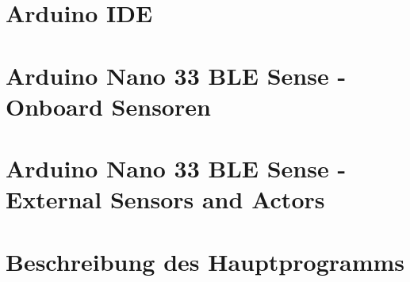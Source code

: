 \documentclass[10pt,a4paper,bibliography=totoc]{scrbook}
\begin{document}


\tableofcontents
\cleardoublepage

\listoffigures
\cleardoublepage

\listofcodes
\cleardoublepage

\cleardoublepage


  



{
\part{Arduino IDE}

      
  
   
  
}



{


\part{Arduino Nano 33 BLE Sense - Onboard Sensoren}

  

}


{

\part{Arduino Nano 33 BLE Sense - External  Sensors and Actors}

  
 
  
  
  
  
  
  
  
  
}

{
	\part{Beschreibung des Hauptprogramms}
	
	
}
\end{document}
